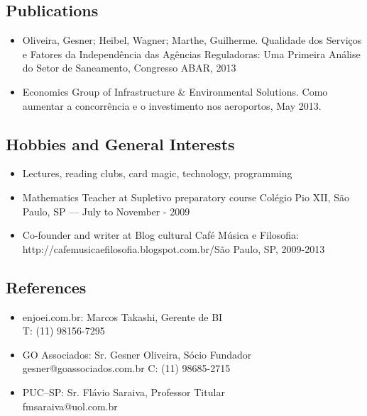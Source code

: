 \documentclass{article}
\begin{document}
\begin{multicols}{2}
\columnbreak

\subsection{Publications}
\begin{itemize}
\item{Oliveira, Gesner; Heibel, Wagner; Marthe, Guilherme. Qualidade dos Serviços e Fatores da Independência das Agências Reguladoras: Uma Primeira Análise do Setor de Saneamento, Congresso ABAR, 2013} 
\item{Economics Group of Infrastructure \& Environmental Solutions. Como aumentar a concorrência e o investimento nos aeroportos, May 2013.}
\end{itemize} 

\subsection{Hobbies and General Interests}
\begin{itemize}
\item{Lectures, reading clubs, card magic, technology, programming} 
\item{Mathematics Teacher at Supletivo preparatory course Colégio Pio XII, São Paulo, SP — July to November - 2009} 
\item{Co-founder and writer at Blog cultural Café Música e Filosofia: http://cafemusicaefilosofia.blogspot.com.br/São Paulo, SP, 2009-2013}
\end{itemize}

\subsection{References}
\begin{itemize}
\item{enjoei.com.br: Marcos Takashi, Gerente de BI\\T: (11) 98156-7295} 
\item{GO Associados: Sr. Gesner Oliveira, Sócio Fundador\\gesner@goassociados.com.br C: (11) 98685-2715} 
\item{PUC–SP: Sr. Flávio Saraiva, Professor Titular\\fmsaraiva@uol.com.br}
\end{itemize}

\end{multicols}
\end{document}
